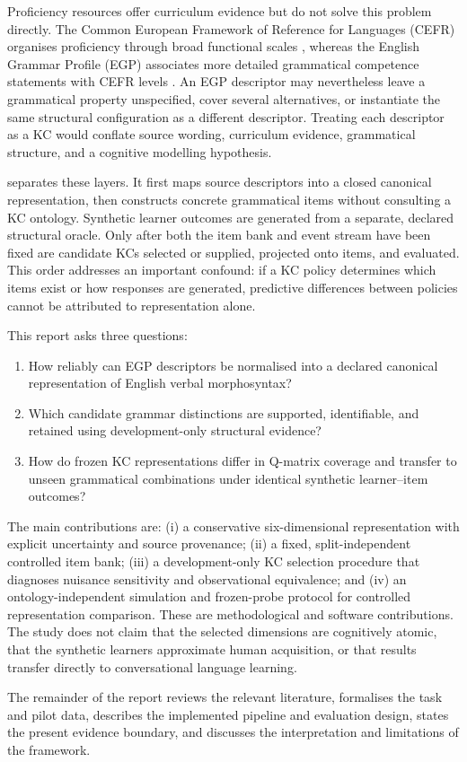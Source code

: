 Proficiency resources offer curriculum evidence but do not solve this problem
directly.  The Common European Framework of Reference for Languages (CEFR)
organises proficiency through broad functional scales \citep{coe-2020-cefr},
whereas the English Grammar Profile (EGP) associates more detailed grammatical
competence statements with CEFR levels \citep{okeeffe-mark-2017}.  An EGP
descriptor may nevertheless leave a grammatical property unspecified, cover
several alternatives, or instantiate the same structural configuration as a
different descriptor.  Treating each descriptor as a KC would conflate source
wording, curriculum evidence, grammatical structure, and a cognitive modelling
hypothesis.

\system separates these layers.  It first maps source descriptors into a
closed canonical representation, then constructs concrete grammatical items
without consulting a KC ontology.  Synthetic learner outcomes are generated
from a separate, declared structural oracle.  Only after both the item bank and
event stream have been fixed are candidate KCs selected or supplied, projected
onto items, and evaluated.  This order addresses an important confound: if a KC
policy determines which items exist or how responses are generated, predictive
differences between policies cannot be attributed to representation alone.

This report asks three questions:
\begin{enumerate}
  \item[RQ1] How reliably can EGP descriptors be normalised into a declared
        canonical representation of English verbal morphosyntax?
  \item[RQ2] Which candidate grammar distinctions are supported,
        identifiable, and retained using development-only structural evidence?
  \item[RQ3] How do frozen KC representations differ in Q-matrix coverage and
        transfer to unseen grammatical combinations under identical synthetic
        learner--item outcomes?
\end{enumerate}

The main contributions are: (i) a conservative six-dimensional
\grammarcell representation with explicit uncertainty and source provenance;
(ii) a fixed, split-independent controlled item bank; (iii) a development-only
KC selection procedure that diagnoses nuisance sensitivity and observational
equivalence; and (iv) an ontology-independent simulation and frozen-probe
protocol for controlled representation comparison.  These are methodological
and software contributions.  The study does not claim that the selected
dimensions are cognitively atomic, that the synthetic learners approximate
human acquisition, or that results transfer directly to conversational
language learning.

The remainder of the report reviews the relevant literature, formalises the
task and pilot data, describes the implemented pipeline and evaluation design,
states the present evidence boundary, and discusses the interpretation and
limitations of the framework.
